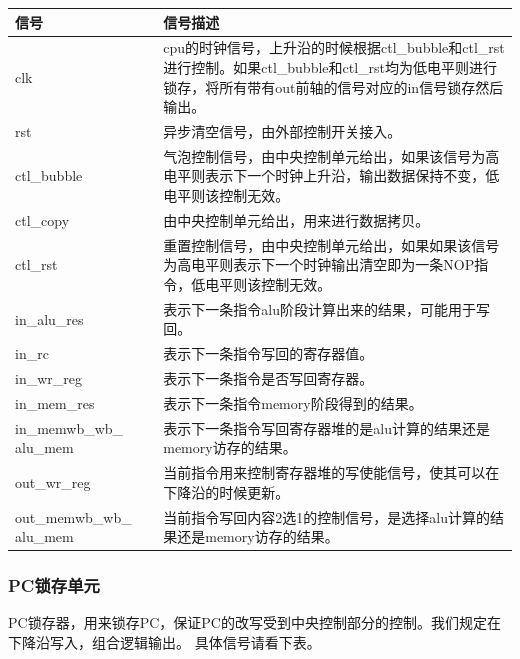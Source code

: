 \begin{center}
    \label{table:memwb}
    \begin{longtable}{p{}p{}}
        \toprule
        信号 & 信号描述 \\
        \midrule
        clk & cpu的时钟信号，上升沿的时候根据ctl\_bubble和ctl\_rst进行控制。如果ctl\_bubble和ctl\_rst均为低电平则进行锁存，将所有带有out前轴的信号对应的in信号锁存然后输出。\\
        rst & 异步清空信号，由外部控制开关接入。\\
        ctl\_bubble &  气泡控制信号，由中央控制单元给出，如果该信号为高电平则表示下一个时钟上升沿，输出数据保持不变，低电平则该控制无效。\\
        ctl\_copy &  由中央控制单元给出，用来进行数据拷贝。\\
        ctl\_rst &  重置控制信号，由中央控制单元给出，如果如果该信号为高电平则表示下一个时钟输出清空即为一条NOP指令，低电平则该控制无效。\\
        in\_alu\_res & 表示下一条指令alu阶段计算出来的结果，可能用于写回。\\
        in\_rc & 表示下一条指令写回的寄存器值。\\
        in\_wr\_reg & 表示下一条指令是否写回寄存器。\\
        in\_mem\_res & 表示下一条指令memory阶段得到的结果。\\
        in\_memwb\_wb\_ alu\_mem & 表示下一条指令写回寄存器堆的是alu计算的结果还是memory访存的结果。\\
        out\_wr\_reg & 当前指令用来控制寄存器堆的写使能信号，使其可以在下降沿的时候更新。\\
        out\_memwb\_wb\_ alu\_mem & 当前指令写回内容2选1的控制信号，是选择alu计算的结果还是memory访存的结果。\\
        \bottomrule
    \end{longtable}
\end{center}

\subsubsection{PC锁存单元}
    PC锁存器，用来锁存PC，保证PC的改写受到中央控制部分的控制。我们规定在下降沿写入，组合逻辑输出。
    具体信号请看下表。


